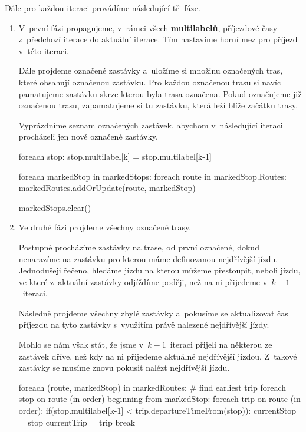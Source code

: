 Dále pro každou iteraci provádíme následující tři fáze.
\begin{enumerate}
    \item V~první fázi propagujeme, v~rámci všech \textbf{multilabelů}, příjezdové časy z~předchozí iterace do aktuální iterace. Tím nastavíme horní mez pro příjezd v~této iteraci.
    
    Dále projdeme označené zastávky a~uložíme si množinu označených tras, které obsahují označenou zastávku. Pro každou označenou trasu si navíc pamatujeme zastávku skrze kterou byla trasa označena. Pokud označujeme již označenou trasu, zapamatujeme si tu zastávku, která leží blíže začátku trasy.
    
    Vyprázdníme seznam označených zastávek, abychom v~následující iteraci procházeli jen nově označené zastávky.
    
    \begin{code}
foreach stop:
  stop.multilabel[k] = stop.multilabel[k-1]

  foreach markedStop in markedStops:
    foreach route in markedStop.Routes:
      markedRoutes.addOrUpdate(route, markedStop)
  
  markedStops.clear()
    \end{code}
    
    \item Ve druhé fázi projdeme všechny označené trasy.
    
    Postupně procházíme zastávky na trase, od první označené, dokud nenarazíme na zastávku pro kterou máme definovanou nejdřívější jízdu. Jednodušeji řečeno, hledáme jízdu na kterou můžeme přestoupit, neboli jízdu, ve které z~aktuální zastávky odjíždíme poději, než na ni přijedeme v~$k-1$~iteraci.
    
    Následně projdeme všechny zbylé zastávky a~pokusíme se aktualizovat čas příjezdu na tyto zastávky s~využitím právě nalezené nejdřívější jízdy.
    
    Mohlo se nám však stát, že jsme v~$k-1$~iteraci přijeli na některou ze zastávek dříve, než kdy na ni přijedeme aktuálně nejdřívější jízdou. Z~takové zastávky se musíme znovu pokusit nalézt nejdřívější jízdu.

    \begin{code}
foreach (route, markedStop) in markedRoutes:
  # find earliest trip
  foreach stop on route (in order) beginning from markedStop:
    foreach trip on route (in order):
        if(stop.multilabel[k-1] < trip.departureTimeFrom(stop)):
          currentStop = stop
          currentTrip = trip
          break


\end{code}
\end{enumerate}
